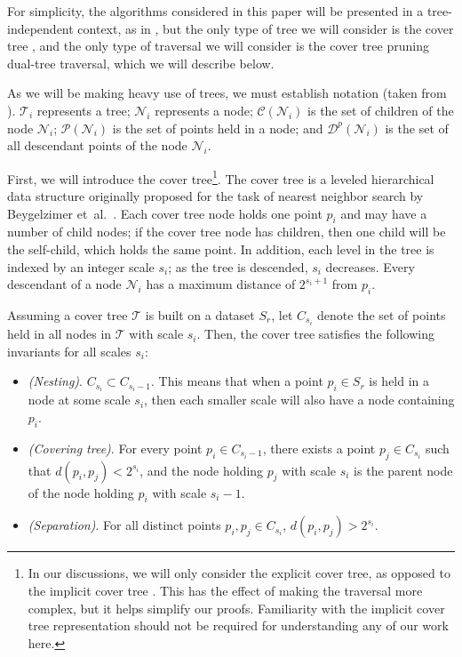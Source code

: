 For simplicity, the algorithms considered in this paper will be presented in a
tree-independent context, as in \cite{curtin2013tree}, but the only type of
tree we will consider is the cover tree \cite{langford2006}, and the only type
of traversal we will consider is the cover tree pruning dual-tree traversal, which
we will describe below.

As we will be making heavy use of trees, we must establish notation (taken from
\cite{curtin2013tree}).  $\mathscr{T}_i$ represents a tree; $\mathscr{N}_i$
represents a node; $\mathscr{C}(\mathscr{N}_i)$ is the set of children of the
node $\mathscr{N}_i$; $\mathscr{P}(\mathscr{N}_i)$ is the set of points held in
a node; and $\mathscr{D}^p(\mathscr{N}_i)$ is the set of all descendant points
of the node $\mathscr{N}_i$.

First, we will introduce the cover tree\footnote{In our discussions, we will
only consider the explicit cover tree, as opposed to the implicit cover tree
\cite{langford2006}.  This has the effect of making the traversal more complex,
but it helps simplify our proofs.  Familiarity with the implicit cover tree
representation should not
be required for understanding any of our work here.}.  The cover tree is a
leveled hierarchical data structure originally proposed for the task of nearest
neighbor search by Beygelzimer et~al.~\cite{langford2006}.  Each cover tree node
holds one point $p_i$ and may have a number of child nodes; if the cover tree
node has children, then one child will be the self-child, which holds the same
point.  In addition, each level in the tree is indexed by an integer scale
$s_i$; as the tree is descended, $s_i$ decreases.  Every descendant of a node
$\mathscr{N}_i$ has a maximum distance of $2^{s_i + 1}$ from $p_i$.

Assuming a cover tree $\mathscr{T}$ is built on a dataset $S_r$, let $C_{s_i}$
denote the set of points held in all nodes in $\mathscr{T}$ with scale $s_i$.
Then, the cover tree satisfies the following invariants for all scales $s_i$:

\vspace*{-0.5em}
\begin{itemize}

\item {\em (Nesting)}.  $C_{s_i} \subset C_{s_i - 1}$.  This means that when a
point $p_i \in S_r$ is held in a node at some scale $s_i$, then each smaller
scale will also have a node containing $p_i$.

\item {\em (Covering tree)}.  For every point $p_i \in C_{s_i - 1}$, there
exists a point $p_j \in C_{s_i}$ such that $d(p_i, p_j) < 2^{s_i}$, and the node
holding $p_j$ with scale $s_i$ is the parent node of the node holding $p_i$ with
scale $s_i - 1$.

\item {\em (Separation)}.  For all distinct points $p_i, p_j \in C_{s_i}$,
$d(p_i, p_j) > 2^{s_i}$.

\end{itemize}
\vspace*{-0.5em}

